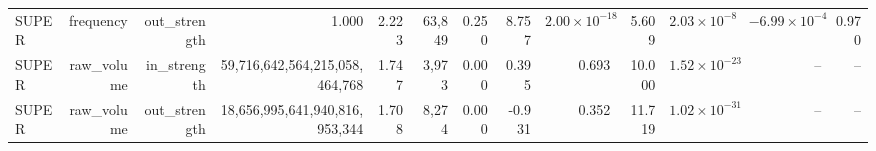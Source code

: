 \begin{table}[t]
\begin{tabular}{lrrrrrrrrrrrr}
SUPER & frequency & out\_strength & 1.000 & 2.223 & 63{,}849 & 0.250 & 8.757 & $2.00\times10^{-18}$ & 5.609 & $2.03\times10^{-8}$ & $-6.99\times10^{-4}$ & 0.970 \\
SUPER & raw\_volume & in\_strength & 59{,}716{,}642{,}564{,}215{,}058{,}464{,}768 & 1.747 & 3{,}973 & 0.000 & 0.395 & 0.693 & 10.000 & $1.52\times10^{-23}$ & -- & -- \\
SUPER & raw\_volume & out\_strength & 18{,}656{,}995{,}641{,}940{,}816{,}953{,}344 & 1.708 & 8{,}274 & 0.000 & -0.931 & 0.352 & 11.719 & $1.02\times10^{-31}$ & -- & -- \\
\bottomrule
\end{tabular}
\end{table}
